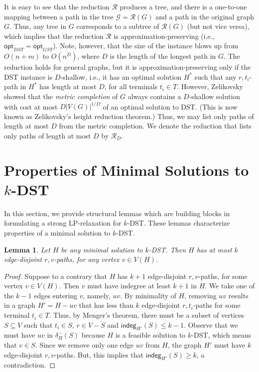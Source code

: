 \documentclass[11pt]{article}
\newtheorem{lemma}[theorem]{Lemma}
\theoremstyle{definition}
\theoremstyle{remark}
\newcommand{\opt}{\mathsf{opt}}
\newcommand{\calG}{\mathcal{G}}
\newcommand{\calR}{\mathcal{R}}
\newcommand{\indeg}{\mathsf{indeg}}
\renewcommand{\setminus}{-}
\begin{document}
It is easy to see that the reduction $\calR$ produces a tree,
and there is a one-to-one mapping between 
a path in the tree $\calG=\calR(G)$ and a path in
the original graph $G$.
Thus, any tree in $G$ corresponds to a subtree of $\calR(G)$ 
(but not vice versa),
which implies that the reduction $\calR$ is approximation-preserving 
(i.e., $\opt_{DST}=\opt_{GST}$). 
Note, however, that the size of the instance blows up 
from $O(n+m)$ to $O(n^D)$, 
where $D$ is the length of the longest path in $G$.
The reduction holds for general graphs, but
it is approximation-preserving only if the DST instance
is $D$-shallow, i.e., it has an optimal solution $H^*$ 
such that any $r,t_i$-path in $H^*$ has length at most $D$, 
for all terminals $t_i\in T$.
However, Zelikovsky~\cite{Zelikovsky97,HelvigRZ01} showed
that the {\em metric completion} of $G$ always contains a $D$-shallow 
solution with cost at most $D|V(G)|^{1/D}$ of 
an optimal solution to DST. 
(This is now known as Zelikovsky's height reduction theorem.)
Thus, we may list only paths of length at most $D$ 
from the metric completion.
We denote the reduction that lists only paths of length at most $D$ by
$\calR_D$.






\section{Properties of Minimal Solutions to $k$-DST}
\label{sec:props-min-solution}

In this section, we provide structural lemmas which are building
blocks in formulating a strong LP-relaxation for $k$-DST. 
These lemmas characterize properties of 
a minimal solution to $k$-DST.

\begin{lemma}
\label{lem:rv-paths-in-minimal-kDST}
Let $H$ be any minimal solution to $k$-DST.
Then $H$ has at most $k$ edge-disjoint $r,v$-paths,
for any vertex $v\in V(H)$.
\end{lemma}
\begin{proof}
Suppose to a contrary that $H$ has $k+1$ edge-disjoint $r,v$-paths,
for some vertex $v\in V(H)$.
Then $v$ must have indegree at least $k+1$ in $H$.
We take one of the $k-1$ edges entering $v$, namely, $uv$.
By minimality of $H$, removing $uv$ results in a graph 
$H'=H\setminus uv$ that has less than 
$k$ edge-disjoint $r,t_i$-paths for some terminal $t_i\in T$.
Thus, by Menger's theorem, 
there must be a subset of vertices $S\subseteq V$
such that $t_i\in S$, $r\in V\setminus S$ and 
$\indeg_{H'}(S) \leq k-1$. 
Observe that we must have $uv$ in $\delta_H^-(S)$ because
$H$ is a feasible solution to $k$-DST, 
which means that $v\in S$.
Since we remove only one edge $uv$ from $H$, 
the graph $H'$ must have $k$ edge-disjoint $r,v$-paths. 
But, this implies that $\indeg_{H'}(S) \geq k$,
a contradiction.
\end{proof}
\end{document}
